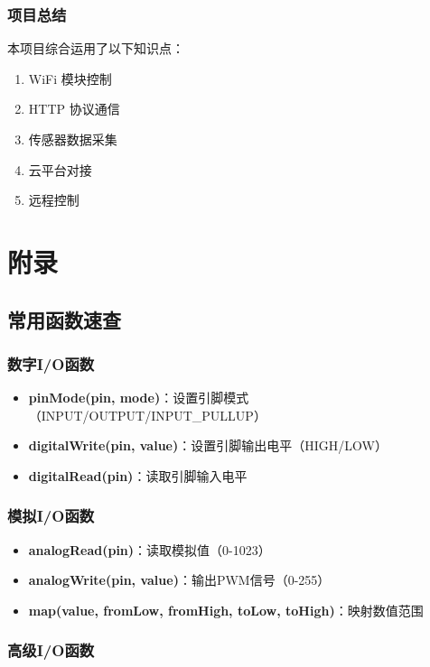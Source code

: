 \documentclass[12pt,UTF8]{ctexbook}
\begin{document}
\section{项目总结}

本项目综合运用了以下知识点：
\begin{enumerate}
    \item WiFi 模块控制
    \item HTTP 协议通信
    \item 传感器数据采集
    \item 云平台对接
    \item 远程控制
\end{enumerate}

\part{附录}

\chapter{常用函数速查}

\section{数字I/O函数}

\begin{itemize}
    \item \textbf{pinMode(pin, mode)}：设置引脚模式（INPUT/OUTPUT/INPUT\_PULLUP）
    \item \textbf{digitalWrite(pin, value)}：设置引脚输出电平（HIGH/LOW）
    \item \textbf{digitalRead(pin)}：读取引脚输入电平
\end{itemize}

\section{模拟I/O函数}

\begin{itemize}
    \item \textbf{analogRead(pin)}：读取模拟值（0-1023）
    \item \textbf{analogWrite(pin, value)}：输出PWM信号（0-255）
    \item \textbf{map(value, fromLow, fromHigh, toLow, toHigh)}：映射数值范围
\end{itemize}

\section{高级I/O函数}
\end{document}
